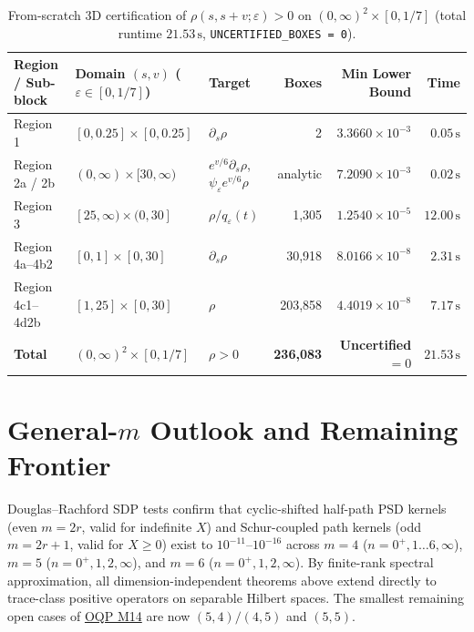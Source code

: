 \documentclass[11pt,a4paper]{article}
\theoremstyle{remark}
\begin{document}
\begin{table}[!htbp]
\centering
\caption{From-scratch 3D certification of $\rho(s,s+v;\varepsilon)>0$ on $(0,\infty)^2\times[0,1/7]$ (total runtime $21.53\,\mathrm{s}$, \texttt{UNCERTIFIED\_BOXES = 0}).}
\label{tab:3d_cert}
\begin{tabularx}{\linewidth}{lXlrrr}
\toprule
Region / Sub-block & Domain $(s,v)$ ($\varepsilon\in[0,1/7]$) & Target & Boxes & Min Lower Bound & Time \\
\midrule
Region 1 & $[0,0.25]\times[0,0.25]$ & $\partial_s\rho$ & 2 & $3.3660\times 10^{-3}$ & $0.05\,\mathrm{s}$ \\
Region 2a / 2b & $(0,\infty)\times[30,\infty)$ & $e^{v/6}\partial_s\rho$, $\psi_\varepsilon e^{v/6}\rho$ & analytic & $7.2090\times 10^{-3}$ & $0.02\,\mathrm{s}$ \\
Region 3 & $[25,\infty)\times(0,30]$ & $\rho/q_\varepsilon(t)$ & 1,305 & $1.2540\times 10^{-5}$ & $12.00\,\mathrm{s}$ \\
Region 4a--4b2 & $[0,1]\times[0,30]$ & $\partial_s\rho$ & 30,918 & $8.0166\times 10^{-8}$ & $2.31\,\mathrm{s}$ \\
Region 4c1--4d2b & $[1,25]\times[0,30]$ & $\rho$ & 203,858 & $4.4019\times 10^{-8}$ & $7.17\,\mathrm{s}$ \\
\midrule
\textbf{Total} & \textbf{$(0,\infty)^2\times[0,1/7]$} & \textbf{$\rho > 0$} & \textbf{236,083} & \textbf{Uncertified $= 0$} & \textbf{$21.53\,\mathrm{s}$} \\
\bottomrule
\end{tabularx}
\end{table}

\section{General-$m$ Outlook and Remaining Frontier}

Douglas--Rachford SDP tests confirm that cyclic-shifted half-path PSD kernels (even $m=2r$, valid for indefinite $X$) and Schur-coupled path kernels (odd $m=2r+1$, valid for $X\ge 0$) exist to $10^{-11}$--$10^{-16}$ across $m=4$ ($n=0^+,1\dots 6,\infty$), $m=5$ ($n=0^+,1,2,\infty$), and $m=6$ ($n=0^+,1,2,\infty$). By finite-rank spectral approximation, all dimension-independent theorems above extend directly to trace-class positive operators on separable Hilbert spaces. The smallest remaining open cases of \href{https://openquantumproblems.com/p/M14}{OQP M14} are now $(5,4)/(4,5)$ and $(5,5)$.
\end{document}
